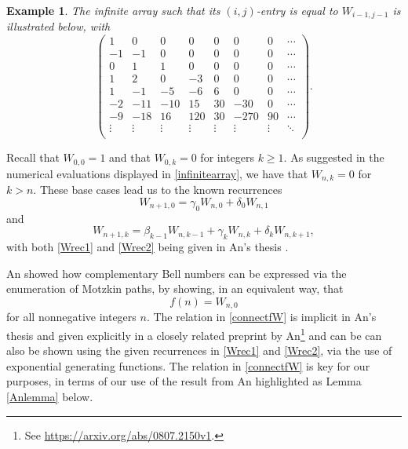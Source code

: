 \documentclass[11pt,letterpaper]{amsart}
\newtheorem{example}{Example}
\begin{document}
\begin{example}
 The infinite array such that its $(i, j)$-entry is equal to $W_{i-1, j-1}$
 is illustrated below, with 
\begin{equation}\label{infinitearray}
\left(
\begin{array}{cccccccc}
 1 & 0 & 0 & 0 & 0 & 0 & 0 & \cdots \\
 -1 & -1 & 0 & 0 & 0 & 0 & 0 & \cdots \\
 0 & 1 & 1 & 0 & 0 & 0 & 0 & \cdots \\
 1 & 2 & 0 & -3 & 0 & 0 & 0 & \cdots \\
 1 & -1 & -5 & -6 & 6 & 0 & 0 & \cdots \\
 -2 & -11 & -10 & 15 & 30 & -30 & 0 & \cdots \\
 -9 & -18 & 16 & 120 & 30 & -270 & 90 & \cdots \\
 \vdots & \vdots & \vdots & \vdots & \vdots & \vdots & \vdots & \ddots \\
\end{array}
\right).
\end{equation}
\end{example}

 Recall that $W_{0, 0} = 1$ and that $W_{0, k} = 0$ for integers $k \geq 1$. As suggested in the numerical evaluations displayed in 
 \eqref{infinitearray}, we have that $W_{n, k} = 0$ for $k > n$. 
 These base cases lead us to the known recurrences 
\begin{equation}\label{Wrec1} 
 W_{n+1, 0} = \gamma_0 W_{n, 0} +\delta_0 W_{n, 1} 
\end{equation}
 and 
\begin{equation}\label{Wrec2} 
 W_{n+1, k} = \beta_{k-1} W_{n, k-1} + \gamma_k W_{n, k} + \delta_k W_{n, k+1}, 
\end{equation}
 with both \eqref{Wrec1} and \eqref{Wrec2} being given in An's thesis
 \cite[p.\ 19]{An2010}. 

 An \cite[\S1.3--2.2]{An2010} showed how complementary Bell numbers can be expressed via the enumeration of Motzkin paths, by 
 showing, in an equivalent way, that 
\begin{equation}\label{connectfW} 
 f(n) = W_{n, 0}
\end{equation}
 for all nonnegative integers $n$. The relation in 
 \eqref{connectfW} is implicit in An's thesis \cite[p.\ 19]{An2010} and given explicitly
 in a closely related preprint by An\footnote{See \url{https://arxiv.org/abs/0807.2150v1}.}
 and can be can also be shown using the given recurrences in 
 \eqref{Wrec1} and \eqref{Wrec2}, via the use of exponential generating functions. 
 The relation in \eqref{connectfW} is key for our purposes, in terms of our use of 
 the result from An highlighted as Lemma \ref{Anlemma} below. 
 
\end{document}
